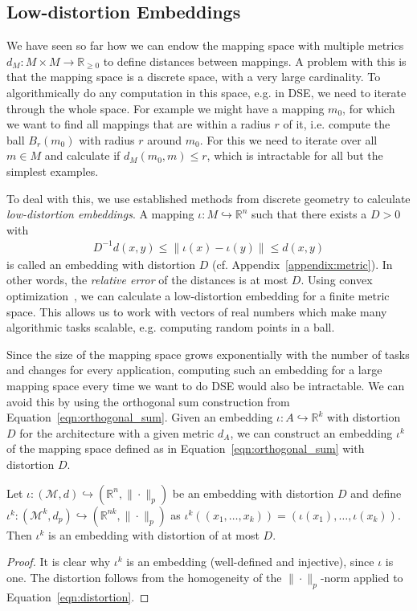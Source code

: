 \subsection{Low-distortion Embeddings}

We have seen so far how we can endow the mapping space with multiple metrics $d_M : M \times M \rightarrow \mathbb{R}_{\geq 0}$ to define distances between mappings.
A problem with this is that the mapping space is a discrete space, with a very large cardinality.
To algorithmically do any computation in this space, e.g. in \ac{DSE}, we need to iterate through the whole space.
For example we might have a mapping $m_0$, for which we want to find all mappings that are within a radius $r$ of it, i.e. compute the ball $B_r(m_0)$ with radius $r$ around $m_0$.
For this we need to iterate over all $m \in M$ and calculate if $d_M(m_0,m) \leq r$, which is intractable for all but the simplest examples.

To deal with this, we use established methods from discrete geometry to calculate \emph{low-distortion embeddings}.
A mapping $\iota : M \hookrightarrow \mathbb{R}^n$ such that there exists a $D > 0$ with
\begin{align}\label{eqn:distortion} D^{-1} d(x,y) \leq \| \iota(x) - \iota(y) \| \leq d(x,y) \end{align}
is called an embedding with distortion $D$ (cf. Appendix~\ref{appendix:metric}).
In other words, the \emph{relative error} of the distances is at most $D$.
Using convex optimization~\cite{matouvsek}, we can calculate a low-distortion embedding for a finite metric space.
This allows us to work with vectors of real numbers which make many algorithmic tasks scalable, e.g. computing random points in a ball.

Since the size of the mapping space grows exponentially with the number of tasks and changes for every application, computing such an embedding for a large mapping space every time we want to do \ac{DSE} would also be intractable.
We can avoid this by using the orthogonal sum construction from Equation~\ref{eqn:orthogonal_sum}.
Given an embedding $\iota : A \hookrightarrow \mathbb{R}^k$ with distortion $D$ for the architecture with a given metric $d_A$, we can construct an embedding $\iota^k$ of the mapping space defined as in Equation~\ref{eqn:orthogonal_sum} with distortion $D$.
\begin{theorem}
\label{thm:iotad}
Let $\iota: (\mathcal{M}, d) \hookrightarrow (\mathbb{R}^n, \| \cdot \|_p)$ be an embedding with distortion $D$ and define $\iota^{k} : (\mathcal{M}^k,d_p) \hookrightarrow (\mathbb{R}^{nk}, \| \cdot \|_p)$ as
$\iota^k ( (x_1,\ldots,x_k)) = (\iota(x_1),\ldots,\iota(x_k))$. Then $\iota^k$ is an embedding with distortion of at most $D$.
\begin{proof}
It is clear why $\iota^k$ is an embedding (well-defined and injective), since $\iota$ is one.
The distortion follows from the homogeneity of the $\| \cdot \|_p$-norm applied to Equation~\ref{eqn:distortion}.
\end{proof}
\end{theorem}
	  
